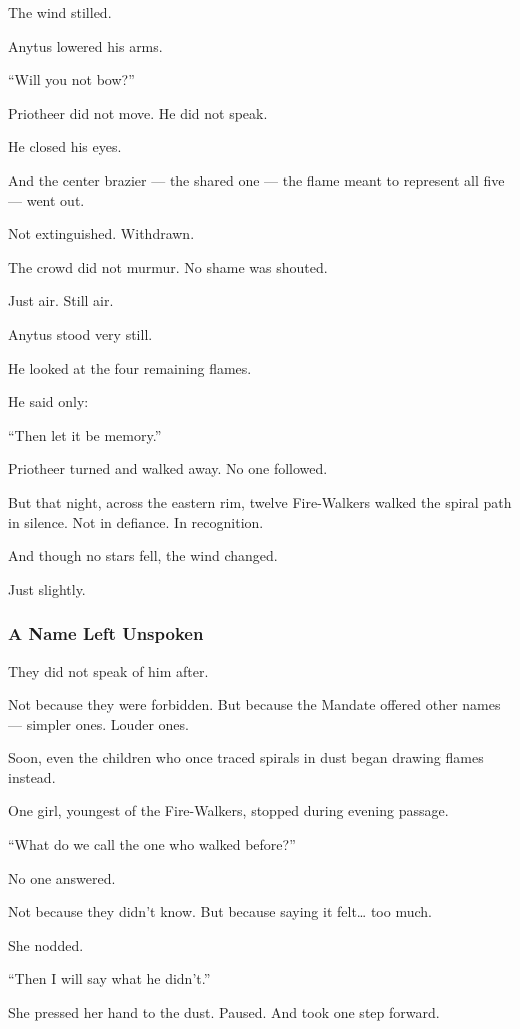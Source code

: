 \documentclass[12pt]{article}
\begin{document}
The wind stilled.

Anytus lowered his arms.

 “Will you not bow?”

Priotheer did not move.  
He did not speak.

He closed his eyes.

And the center brazier — the shared one —  
the flame meant to represent all five —  
went out.

Not extinguished.  
Withdrawn.

The crowd did not murmur.  
No shame was shouted.

Just air.  
Still air.

Anytus stood very still.

He looked at the four remaining flames.

He said only:

 “Then let it be memory.”

Priotheer turned and walked away.  
No one followed.

But that night, across the eastern rim,  
twelve Fire-Walkers walked the spiral path in silence.  
Not in defiance.  
In recognition.

And though no stars fell,  
the wind changed.

Just slightly.

\dotfill

\subsubsection*{A Name Left Unspoken}

They did not speak of him after.

Not because they were forbidden.  
But because the Mandate offered other names —  
simpler ones.  
Louder ones.

Soon, even the children who once traced spirals in dust  
began drawing flames instead.

One girl, youngest of the Fire-Walkers,  
stopped during evening passage.

 “What do we call the one who walked before?”

No one answered.

Not because they didn’t know.  
But because saying it felt… too much.

She nodded.

 “Then I will say what he didn’t.”

She pressed her hand to the dust.  
Paused.  
And took one step forward.
\end{document}
